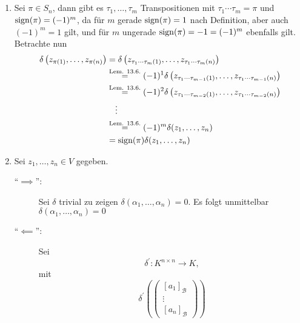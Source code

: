 \documentclass[sectionformat = aufgabe]{gadsescript}
\begin{document}
\subsection{}
\begin{enumerate}[label=(\alph*)]
	\item Sei $ \pi \in S_n $, dann gibt es $ \tau_1, \dotsc, \tau_m $ Transpositionen mit $ \tau_1 \dotsb \tau_m = \pi  $ und $ \operatorname{sign}(\pi) = (-1)^{m}  $, da für $ m $ gerade $ \operatorname{sign}(\pi ) = 1 $ nach Definition, aber auch $ (-1)^{m} = 1 $ gilt, und für $ m $ ungerade $ \operatorname{sign}(\pi ) = -1 = (-1)^{m}  $ ebenfalls gilt.\\
		Betrachte nun
		\begin{align*}
			\delta \left( z_{\pi (1)}, \dotsc, z_{\pi (n)}  \right) &= \delta \left( z_{\tau_1 \dotsb \tau_m (1)} , \dotsc, z_{\tau_1 \dotsb \tau_m (n)}  \right)  \\
			~ &\overset{\text{Lem. 13.6.}}{=} (-1)^{1} \delta \left( z_{\tau_1 \dotsb \tau_{m - 1}  (1)} , \dotsc, z_{\tau_1 \dotsb \tau_{m - 1}  (n)}  \right)  \\
			~ &\overset{\text{Lem. 13.6.}}{=} (-1)^{2} \delta \left( z_{\tau_1 \dotsb \tau_{m - 2}  (1)} , \dotsc, z_{\tau_1 \dotsb \tau_{m - 2}  (n)}  \right)  \\
			~ & \quad \vdots \\
			~ &\overset{\text{Lem. 13.6.} }{=} (-1)^{m} \delta ( z_1, \dotsc, z_n) \\
			~ &= \operatorname{sign}(\pi ) \delta( z_1, \dotsc, z_n) \\
		\end{align*}
	\item Sei $ z_1, \dotsc, z_n \in V $ gegeben.
		\begin{description}
			\item[``$ \implies  $'':] Sei $ \delta $ trivial zu zeigen $ \delta(\alpha_1, \dotsc, \alpha_n) = 0 $.
				Es folgt unmittelbar $ \delta(\alpha_1, \dotsc, \alpha_n) = 0 $ 
			\item[``$ \impliedby  $'':] Sei
				\[
					\delta^\prime : K^{n \times n} \to K,
				\]
				mit
				\[
					\delta^\prime \left( \begin{pmatrix} [a_1]_\mathcal{B}  \\ \vdots \\ [a_n]_\mathcal{B}  \end{pmatrix} \right)
\]
\end{description}
\end{enumerate}
\end{document}
